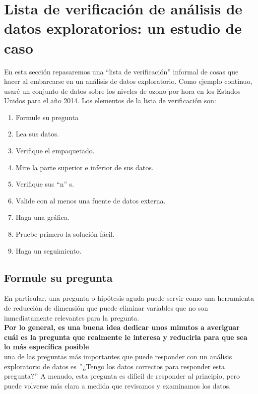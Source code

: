 \documentclass[10pt]{book}
\begin{document}
    \section{Lista de verificación de análisis de datos exploratorios: un estudio de caso}
    En esta sección repasaremos una “lista de verificación” informal de cosas que hacer al embarcarse en un análisis de datos exploratorio. Como ejemplo continuo, usaré un conjunto de datos sobre los niveles de ozono por hora en los Estados Unidos para el año 2014. Los elementos de la lista de verificación son:
    \begin{enumerate}[\bfseries 1.]
        \item Formule su pregunta
        \item Lea sus datos. 
        \item Verifique el empaquetado. 
        \item Mire la parte superior e inferior de sus datos. 
        \item Verifique sus “n” s. 
        \item Valide con al menos una fuente de datos externa. 
        \item Haga una gráfica. 
        \item Pruebe primero la solución fácil.
        \item Haga un seguimiento.
    \end{enumerate}

        \subsection{Formule su pregunta}
        En particular, una pregunta o hipótesis aguda puede servir como una herramienta de reducción de dimensión que puede eliminar variables que no son inmediatamente relevantes para la pregunta. \\
        \textbf{ Por lo general, es una buena idea dedicar unos minutos a averiguar cuál es la pregunta que realmente le interesa y reducirla para que sea lo más específica posible}\\
        una de las preguntas más importantes que puede responder con un análisis exploratorio de datos es $"$¿Tengo los datos correctos para responder esta pregunta?$"$ A menudo, esta pregunta es difícil de responder al principio, pero puede volverse más clara a medida que revisamos y examinamos los datos.
\end{document}
